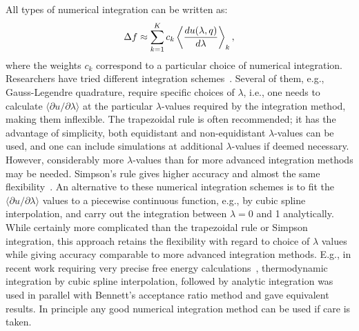 All types of numerical integration can be written as:
\[ \Delta f \approx \sum_{k=1}^{K} c_k
\left\langle{\frac{du(\lambda,q)}{d\lambda}}\right\rangle_{k}, \] where the weights $c_k$ correspond to a particular choice of numerical integration.
Researchers have tried different integration schemes~\cite{resat1993studies,jorge2010effect,shyu2009reducing,Bruckner2010}. Several of them, e.g., Gauss-Legendre quadrature, require specific choices of $\lambda$, i.e., one needs to calculate $\langle\partial u/\partial \lambda\rangle$ at the particular $\lambda$-values required by the integration method, making them inflexible. The trapezoidal rule is often recommended; it has the advantage of simplicity, both equidistant and non-equidistant $\lambda$-values can be used, and one can include simulations at additional $\lambda$-values if deemed necessary. However, considerably more $\lambda$-values than for more advanced integration methods may be needed. Simpson's rule gives higher accuracy and almost the same flexibility~\cite{Bruckner2010}. An alternative to these numerical integration schemes is to fit the  $\langle\partial u/\partial \lambda\rangle$ values to a piecewise continuous function, e.g., by cubic spline interpolation, and carry out the integration between $\lambda=0$ and 1 analytically. While certainly more complicated than the trapezoidal rule or Simpson integration,  this approach retains the flexibility with regard to choice of $\lambda$ values while giving accuracy comparable to more advanced integration methods. E.g., in recent work requiring very precise free energy calculations~\cite{Fleck_2021}, thermodynamic integration by cubic spline interpolation, followed by analytic integration  was used in parallel with Bennett's acceptance ratio method and gave equivalent results. In principle any good numerical integration method can be used if care is taken.  

